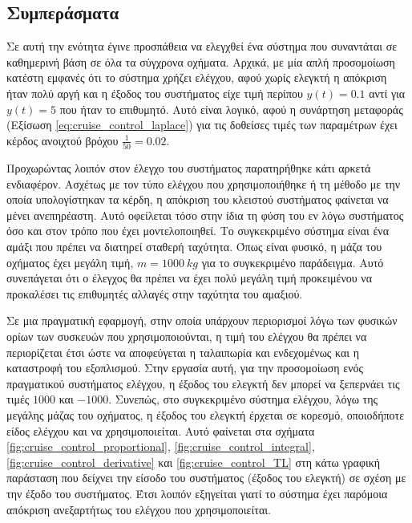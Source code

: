 
\subsection{Συμπεράσματα}

Σε αυτή την ενότητα έγινε προσπάθεια να ελεγχθεί ένα σύστημα που συναντάται σε καθημερινή βάση σε όλα τα σύγχρονα οχήματα. Αρχικά, με μία απλή προσομοίωση κατέστη εμφανές ότι το σύστημα χρήζει ελέγχου, αφού χωρίς ελεγκτή η απόκριση ήταν πολύ αργή και η έξοδος του συστήματος είχε τιμή περίπου $y(t) = 0.1$ αντί για $y(t) = 5$ που ήταν το επιθυμητό. Αυτό είναι λογικό, αφού η συνάρτηση μεταφοράς (Εξίσωση \ref{eq:cruise_control_laplace}) για τις δοθείσες τιμές των παραμέτρων έχει κέρδος ανοιχτού βρόχου $\displaystyle \frac{1}{50} = 0.02$.

Προχωρώντας λοιπόν στον έλεγχο του συστήματος παρατηρήθηκε κάτι αρκετά ενδιαφέρον. Ασχέτως με τον τύπο ελέγχου που χρησιμοποιήθηκε ή τη μέθοδο με την οποία υπολογίστηκαν τα κέρδη, η απόκριση του κλειστού συστήματος φαίνεται να μένει ανεπηρέαστη. Αυτό οφείλεται τόσο στην ίδια τη φύση του εν λόγω συστήματος όσο και στον τρόπο που έχει μοντελοποιηθεί. Το συγκεκριμένο σύστημα είναι ένα αμάξι που πρέπει να διατηρεί σταθερή ταχύτητα. Όπως είναι φυσικό, η μάζα του οχήματος έχει μεγάλη τιμή, $m = 1000\ kg$ για το συγκεκριμένο παράδειγμα. Αυτό συνεπάγεται ότι ο έλεγχος θα πρέπει να έχει πολύ μεγάλη τιμή προκειμένου να προκαλέσει τις επιθυμητές αλλαγές στην ταχύτητα του αμαξιού.

Σε μια πραγματική εφαρμογή, στην οποία υπάρχουν περιορισμοί λόγω των φυσικών ορίων των συσκευών που χρησιμοποιούνται, η τιμή του ελέγχου θα πρέπει να περιορίζεται έτσι ώστε να αποφεύγεται η ταλαιπωρία και ενδεχομένως και η καταστροφή του εξοπλισμού. Στην εργασία αυτή, για την προσομοίωση ενός πραγματικού συστήματος ελέγχου, η έξοδος του ελεγκτή δεν μπορεί να ξεπερνάει τις τιμές $1000$ και $-1000$. Συνεπώς, στο συγκεκριμένο σύστημα ελέγχου, λόγω της μεγάλης μάζας του οχήματος, η έξοδος του ελεγκτή έρχεται σε κορεσμό, οποιοδήποτε είδος ελέγχου και να χρησιμοποιείται. Αυτό φαίνεται στα σχήματα \ref{fig:cruise_control_proportional}, \ref{fig:cruise_control_integral}, \ref{fig:cruise_control_derivative} και \ref{fig:cruise_control_TL} στη κάτω γραφική παράσταση που δείχνει την είσοδο του συστήματος (έξοδος του ελεγκτή) σε σχέση με την έξοδο του συστήματος. Έτσι λοιπόν εξηγείται γιατί το σύστημα έχει παρόμοια απόκριση ανεξαρτήτως του ελέγχου που χρησιμοποιείται. 


